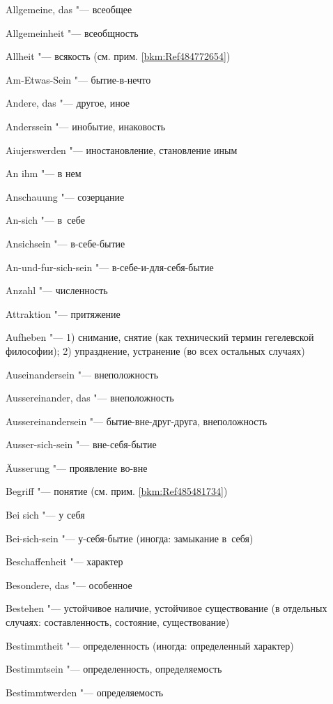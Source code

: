\bigskip

\begin{multicols}{2}
Allgemeine, das "--- всеобщее

Allgemein\-heit "--- всеобщность

Allheit "--- всякость (см. прим. \ref{bkm:Ref484772654})

Am-Etwas-Sein "--- бытие-в-нечто

Andere, das "--- другое, иное

Anderssein "--- инобытие, инаковость

Aiujers\-werden "--- иностановление, становление иным

An ihm "--- в нем

Anschauung "--- созерцание

An-sich "--- в~себе

Ansichsein "--- в-себе-бытие

An-und-fur-sich-sein "--- в-себе-и-для-себя-бытие

Anzahl "--- численность

Attraktion "--- притяжение

Aufheben "--- 1) снимание, снятие (как технический термин гегелевской
философии); 2) упразднение, устранение (во всех остальных случаях)

Ausein\-ander\-sein "--- внеположность

Ausser\-ein\-ander, das "--- внеположность

Ausser\-ein\-ander\-sein "--- бытие-вне-друг-друга, внеположность

Ausser-sich-sein "--- вне-себя-бытие

Äusserung "--- проявление во-вне

\bigskip

Begriff "--- понятие (см. прим. \ref{bkm:Ref485481734})

Bei sich "--- у себя

Bei-sich-sein "--- у-себя-бытие (иногда: замыкание в~себя)

Beschaffen\-heit "--- характер

Besondere, das "--- особенное

Bestehen "--- устойчивое наличие, устойчивое существование (в
отдельных случаях: составленность, состояние, существование)

Bestimmt\-heit "--- определенность (иногда: определенный характер)

Bestimmt\-sein "--- определенность, определяемость

Bestimmt\-werden "--- определяемость


\end{multicols}

